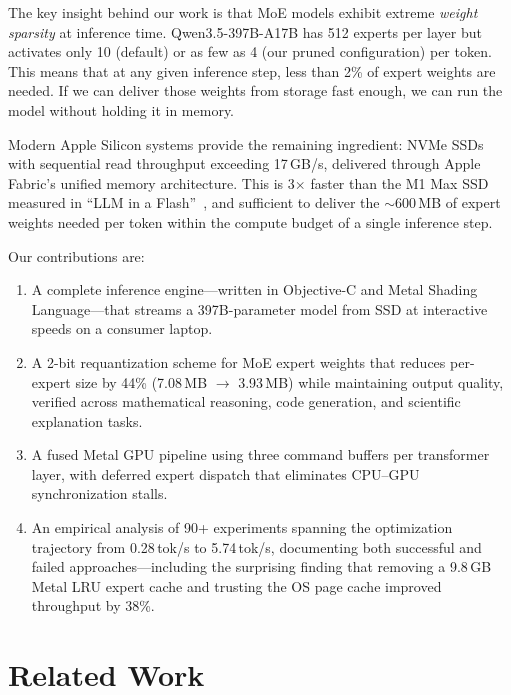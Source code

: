 \documentclass[11pt,twocolumn]{article}
\begin{document}
The key insight behind our work is that MoE models exhibit extreme \emph{weight sparsity} at inference time.
Qwen3.5-397B-A17B has 512 experts per layer but activates only 10 (default) or as few as 4 (our pruned configuration) per token.
This means that at any given inference step, less than 2\% of expert weights are needed.
If we can deliver those weights from storage fast enough, we can run the model without holding it in memory.

Modern Apple Silicon systems provide the remaining ingredient: NVMe SSDs with sequential read throughput exceeding 17\,GB/s, delivered through Apple Fabric's unified memory architecture.
This is 3$\times$ faster than the M1 Max SSD measured in ``LLM in a Flash''~\cite{alizadeh2023llm}, and sufficient to deliver the $\sim$600\,MB of expert weights needed per token within the compute budget of a single inference step.

Our contributions are:
\begin{enumerate}[leftmargin=*,itemsep=1pt]
    \item A complete inference engine---written in Objective-C and Metal Shading Language---that streams a 397B-parameter model from SSD at interactive speeds on a consumer laptop.
    \item A 2-bit requantization scheme for MoE expert weights that reduces per-expert size by 44\% (7.08\,MB $\to$ 3.93\,MB) while maintaining output quality, verified across mathematical reasoning, code generation, and scientific explanation tasks.
    \item A fused Metal GPU pipeline using three command buffers per transformer layer, with deferred expert dispatch that eliminates CPU--GPU synchronization stalls.
    \item An empirical analysis of 90+ experiments spanning the optimization trajectory from 0.28\,tok/s to 5.74\,tok/s, documenting both successful and failed approaches---including the surprising finding that removing a 9.8\,GB Metal LRU expert cache and trusting the OS page cache improved throughput by 38\%.
\end{enumerate}

\section{Related Work}
\end{document}
